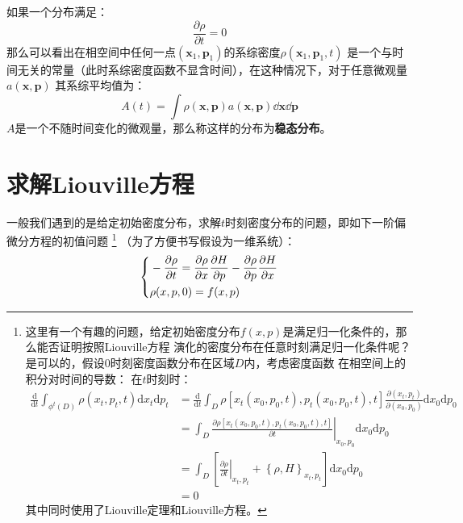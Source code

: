     如果一个分布满足：
    \begin{equation}
        \frac {\partial \rho}{\partial t} = 0
    \end{equation}
    那么可以看出在相空间中任何一点$(\bm{x}_1, \bm{p}_1)$的系综密度$\rho(\bm{x}_1, \bm{p}_1, t)$
    是一个与时间无关的常量（此时系综密度函数不显含时间），在这种情况下，对于任意微观量$a(\bm{x}, \bm{p})$
    其系综平均值为：
    \begin{equation}
        A(t) = \int\rho(\bm{x}, \bm{p})a(\bm{x}, \bm{p})\dd \bm{x}\dd \bm{p}
    \end{equation}
    $A$是一个不随时间变化的微观量，那么称这样的分布为\textbf{稳态分布}。

    \section{求解Liouville方程}
    一般我们遇到的是给定初始密度分布，求解$t$时刻密度分布的问题，即如下一阶偏微分方程的初值问题
    \footnote{
        这里有一个有趣的问题，给定初始密度分布$f(x, p)$是满足归一化条件的，那么能否证明按照Liouville方程
        演化的密度分布在任意时刻满足归一化条件呢？是可以的，假设0时刻密度函数分布在区域$D$内，考虑密度函数
        在相空间上的积分对时间的导数：
        在$t$时刻时：
        \begin{equation}
            \begin{split}
                \frac{\mathrm{d}}{\mathrm{d}t}\int_{\phi^{t}(D)}\rho(x_{t}, p_{t},t)\mathrm{d}x_{t}\mathrm{d}p_{t} &= \frac{\mathrm{d}}{\mathrm{d}t}\int_{D}\rho[x_{t}(x_{0},p_{0},t), p_{t}(x_{0},p_{0},t),t]\frac{\partial(x_{t},p_{t})}{\partial(x_{0},p_{0})}\mathrm{d}x_{0}\mathrm{d}p_{0}\\
                &= \int_{D}\left.\frac{\partial \rho[x_{t}(x_{0},p_{0},t), p_{t}(x_{0},p_{0},t),t]}{\partial t}\right|_{x_{0},p_{0}}\mathrm{d}x_{0}\mathrm{d}p_{0}\\
                &= \int_{D}\left[\left.\frac{\partial \rho}{\partial t}\right|_{x_{t},p_{t}} + \left\{\rho, H\right\}_{x_{t},p_{t}}\right]\mathrm{d}x_{0}\mathrm{d}p_{0}\\
                &=0 
            \end{split}
            \label{conservation of density}
        \end{equation}
        其中同时使用了Liouville定理和Liouville方程。  
    }
    （为了方便书写假设为一维系统）：
    \begin{equation}
        \left\{
        \begin{split}
            &-\frac{\partial{\rho}}{\partial{t}} = \frac{\partial{\rho}}{\partial{x}}\frac{\partial{H}}{\partial{p}} - \frac{\partial{\rho}}{\partial{p}}\frac{\partial{H}}{\partial{x}}\\
            &\rho(x, p, 0) = f(x, p)
        \end{split}
        \right.
        \label{Liouville equation Cauchy problem}
    \end{equation}
